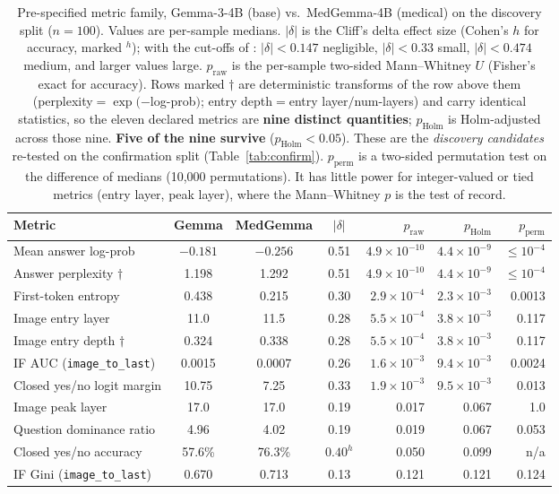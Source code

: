 \begin{table}[h]
\centering
\caption{Pre-specified metric family, Gemma-3-4B (base) vs.\ MedGemma-4B (medical)
on the discovery split ($n{=}100$). Values are per-sample medians. $|\delta|$ is the
Cliff's delta effect size (Cohen's $h$ for accuracy, marked $^{h}$); with the cut-offs of \citet{romano2006appropriate}:
$|\delta|{<}0.147$ negligible, $|\delta|{<}0.33$ small, $|\delta|{<}0.474$ medium, and larger values large.
$p_\text{raw}$ is the per-sample two-sided Mann--Whitney $U$ (Fisher's exact for
accuracy). Rows marked $\dagger$ are deterministic transforms of the row above them
(perplexity${=}\exp(-$log-prob$)$; entry depth${=}$entry layer${/}$num-layers) and
carry identical statistics, so the eleven declared metrics are \textbf{nine distinct
quantities}; $p_\text{Holm}$ is Holm-adjusted across those nine. \textbf{Five of the
nine survive} ($p_\text{Holm}{<}0.05$). These are the \emph{discovery candidates}
re-tested on the confirmation split (Table~\ref{tab:confirm}). $p_\text{perm}$ is a
two-sided permutation test on the difference of medians (10{,}000 permutations). It has
little power for integer-valued or tied metrics (entry layer, peak layer), where the
Mann--Whitney $p$ is the test of record.}
\label{tab:family}
\begin{tabular}{lcccrrr}
\toprule
\textbf{Metric} & \textbf{Gemma} & \textbf{MedGemma} & $|\delta|$ & $p_\text{raw}$ & $p_\text{Holm}$ & \textbf{$p_\text{perm}$} \\
\midrule
Mean answer log-prob           & $-0.181$ & $-0.256$ & 0.51 & $4.9{\times}10^{-10}$ & $4.4{\times}10^{-9}$ & $\le 10^{-4}$ \\
\quad Answer perplexity $\dagger$ & 1.198 & 1.292 & 0.51 & $4.9{\times}10^{-10}$ & $4.4{\times}10^{-9}$ & $\le 10^{-4}$ \\
First-token entropy            & 0.438  & 0.215  & 0.30 & $2.9{\times}10^{-4}$ & $2.3{\times}10^{-3}$ & 0.0013 \\
Image entry layer              & 11.0   & 11.5   & 0.28 & $5.5{\times}10^{-4}$ & $3.8{\times}10^{-3}$ & 0.117 \\
\quad Image entry depth $\dagger$ & 0.324 & 0.338 & 0.28 & $5.5{\times}10^{-4}$ & $3.8{\times}10^{-3}$ & 0.117 \\
IF AUC (\texttt{image\_to\_last}) & 0.0015 & 0.0007 & 0.26 & $1.6{\times}10^{-3}$ & $9.4{\times}10^{-3}$ & 0.0024 \\
Closed yes/no logit margin     & 10.75  & 7.25   & 0.33 & $1.9{\times}10^{-3}$ & $9.5{\times}10^{-3}$ & 0.013 \\
\midrule
Image peak layer               & 17.0   & 17.0   & 0.19 & 0.017 & 0.067 & 1.0 \\
Question dominance ratio       & 4.96   & 4.02   & 0.19 & 0.019 & 0.067 & 0.053 \\
Closed yes/no accuracy         & 57.6\% & 76.3\% & $0.40^{h}$ & 0.050 & 0.099 & n/a \\
IF Gini (\texttt{image\_to\_last}) & 0.670 & 0.713 & 0.13 & 0.121 & 0.121 & 0.124 \\
\bottomrule
\end{tabular}
\end{table}

